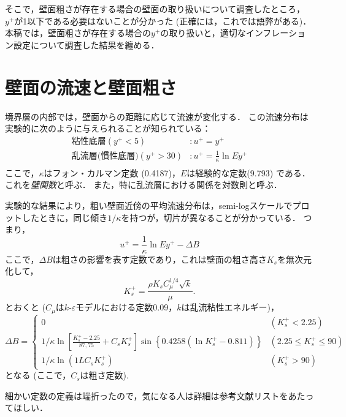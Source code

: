 \documentclass[uplatex,dvipdfmx,a4j,12pt]{jsarticle}
\begin{document}
そこで，壁面粗さが存在する場合の壁面の取り扱いについて調査したところ，$y^+$が1以下である必要はないことが分かった (正確には，これでは語弊がある)．
本稿では，壁面粗さが存在する場合の$y^+$の取り扱いと，適切なインフレーション設定について調査した結果を纏める．

\section{壁面の流速と壁面粗さ}
境界層の内部では，壁面からの距離に応じて流速が変化する．
この流速分布は実験的に次のように与えられることが知られている：
\begin{align}
  \text{粘性底層}(y^+ < 5) & : u^+ = y^+ \\
  \text{乱流層(慣性底層)} (y^+ > 30) & : u^+ = \frac{1}{\kappa} \ln Ey^+ \\
\end{align}
ここで，$\kappa$はフォン・カルマン定数 (0.4187)，$E$は経験的な定数(9.793) である．
これを\emph{壁関数}と呼ぶ．
また，特に乱流層における関係を対数則と呼ぶ．

実験的な結果により，粗い壁面近傍の平均流速分布は，semi-logスケールでプロットしたときに，同じ傾き$1/\kappa$を持つが，切片が異なることが分かっている．
つまり，
\begin{equation}
  u^+ = \frac{1}{\kappa} \ln E y^+ - \Delta B
\end{equation}
ここで，$\Delta B$は粗さの影響を表す定数であり，これは壁面の粗さ高さ$K_s$を無次元化して，
\begin{equation}
  K_s^+ = \frac{\rho K_s C_\mu^{1/4}\sqrt{k}}{\mu}.
\end{equation}
とおくと ($C_\mu$は$k$-$\varepsilon$モデルにおける定数0.09，$k$は乱流粘性エネルギー)，
\begin{equation}
  \Delta B =
  \begin{cases}
    0 & (K_s^+ < 2.25) \\
    1 / \kappa \ln \left[ \frac{K_s^+ - 2.25}{87,75} + C_s K_s^+ \right] \sin\left\{0.4258(\ln K_s^+ - 0.811)\right\} & (2.25 \leq K_s^+ \leq 90) \\
    1 / \kappa \ln \left( 1 L C_s K_s^+ \right) & (K_s^+ > 90)
  \end{cases}
\end{equation}
となる (ここで，$C_s$は粗さ定数).

細かい定数の定義は端折ったので，気になる人は詳細は参考文献リストをあたってほしい．
\end{document}
